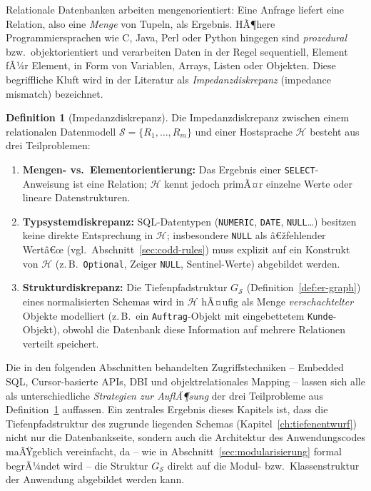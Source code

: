 ﻿\documentclass[a4paper,12pt]{report}
\theoremstyle{definition}
\newtheorem{definition}{Definition}[chapter]
\theoremstyle{remark}
\begin{document}
Relationale Datenbanken arbeiten mengenorientiert: Eine Anfrage liefert
eine Relation, also eine \emph{Menge} von Tupeln, als Ergebnis. HÃ¶here
Programmiersprachen wie C, Java, Perl oder Python hingegen sind
\emph{prozedural} bzw.\ objektorientiert und verarbeiten Daten in der
Regel sequentiell, Element fÃ¼r Element, in Form von Variablen, Arrays,
Listen oder Objekten. Diese begriffliche Kluft wird in der Literatur
als \emph{Impedanzdiskrepanz} (impedance mismatch) bezeichnet.

\begin{definition}[Impedanzdiskrepanz]
\label{def:impedanz}
Die Impedanzdiskrepanz zwischen einem relationalen Datenmodell
$\mathcal{S}=\{R_1,\ldots,R_m\}$ und einer Hostsprache $\mathcal{H}$
besteht aus drei Teilproblemen:
\begin{enumerate}
  \item \textbf{Mengen- vs.\ Elementorientierung:} Das Ergebnis einer
    \texttt{SELECT}-Anweisung ist eine Relation; $\mathcal{H}$ kennt
    jedoch primÃ¤r einzelne Werte oder lineare Datenstrukturen.
  \item \textbf{Typsystemdiskrepanz:} SQL-Datentypen
    (\texttt{NUMERIC}, \texttt{DATE}, \texttt{NULL}\ldots) besitzen
    keine direkte Entsprechung in $\mathcal{H}$; insbesondere
    \texttt{NULL} als â€žfehlender Wertâ€œ (vgl.\
    Abschnitt~\ref{sec:codd-rules}) muss explizit auf ein Konstrukt von
    $\mathcal{H}$ (z.\,B.\ \texttt{Optional}, Zeiger \texttt{NULL},
    Sentinel-Werte) abgebildet werden.
  \item \textbf{Strukturdiskrepanz:} Die Tiefenpfadstruktur
    $G_{\mathcal{S}}$ (Definition~\ref{def:er-graph}) eines
    normalisierten Schemas wird in $\mathcal{H}$ hÃ¤ufig als Menge
    \emph{verschachtelter} Objekte modelliert (z.\,B.\ ein
    \texttt{Auftrag}-Objekt mit eingebettetem \texttt{Kunde}-Objekt),
    obwohl die Datenbank diese Information auf mehrere Relationen
    verteilt speichert.
\end{enumerate}
\end{definition}

Die in den folgenden Abschnitten behandelten Zugriffstechniken --
Embedded SQL, Cursor-basierte APIs, DBI und objektrelationales Mapping
-- lassen sich alle als unterschiedliche \emph{Strategien zur
AuflÃ¶sung} der drei Teilprobleme aus Definition~\ref{def:impedanz}
auffassen. Ein zentrales Ergebnis dieses Kapitels ist, dass die
Tiefenpfadstruktur des zugrunde liegenden Schemas (Kapitel~\ref{ch:tiefenentwurf})
nicht nur die Datenbankseite, sondern auch die Architektur des
Anwendungscodes maÃŸgeblich vereinfacht, da -- wie in
Abschnitt~\ref{sec:modularisierung} formal begrÃ¼ndet wird -- die
Struktur $G_{\mathcal{S}}$ direkt auf die Modul- bzw.\
Klassenstruktur der Anwendung abgebildet werden kann.
\end{document}
